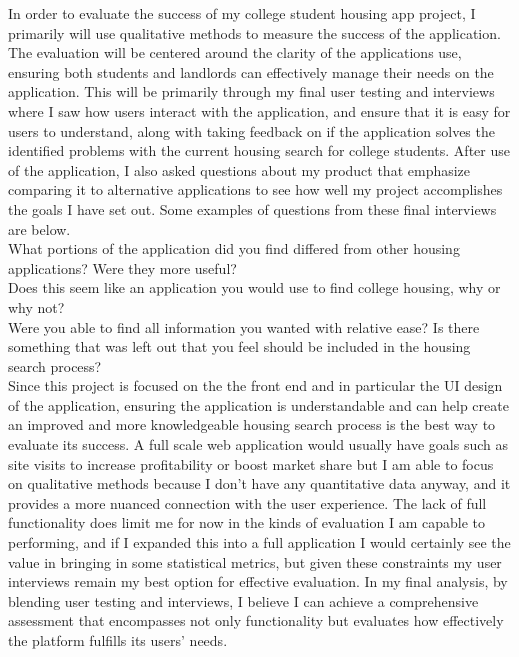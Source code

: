 \documentclass[10pt,twocolumn]{article}
\begin{document}
In order to evaluate the success of my college student housing app project, I primarily will use qualitative methods to measure the success of the application. The evaluation will be centered around the clarity of the applications use, ensuring both students and landlords can effectively manage their needs on the application. This will be primarily through my final user testing and interviews where I saw how users interact with the application, and ensure that it is easy for users to understand, along with taking feedback on if the application solves the identified problems with the current housing search for college students. After use of the application, I also asked questions about my product that emphasize comparing it to alternative applications to see how well my project accomplishes the goals I have set out. Some examples of questions from these final interviews are below. \\
What portions of the application did you find differed from other housing applications? Were they more useful? \\
Does this seem like an application you would use to find college housing, why or why not? \\
Were you able to find all information you wanted with relative ease? Is there something that was left out that you feel should be included in the housing search process? \\

Since this project is focused on the the front end and in particular the UI design of the application, ensuring the application is understandable and can help create an improved and more knowledgeable housing search process is the best way to evaluate its success. A full scale web application would usually have goals such as site visits to increase profitability or boost market share but I am able to focus on qualitative methods because I don't have any quantitative data anyway, and it provides a more nuanced connection with the user experience.\cite{belanger2006web} The lack of full functionality does limit me for now in the kinds of evaluation I am capable to performing, and if I expanded this into a full application I would certainly see the value in bringing in some statistical metrics, but given these constraints my user interviews remain my best option for effective evaluation. In my final analysis, by blending user testing and interviews, I believe I can achieve a comprehensive assessment that encompasses not only functionality but evaluates how effectively the platform fulfills its users' needs.
\end{document}
